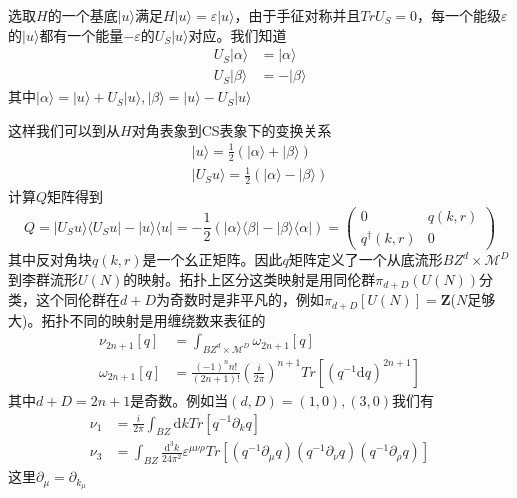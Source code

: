 \documentclass{article}
\numberwithin{equation}{subsection}
\begin{document}
选取$H$的一个基底$|u\rangle$满足$H|u\rangle=\varepsilon|u\rangle$，由于手征对称并且$TrU_S=0$，每一个能级$\varepsilon$的$|u\rangle$都有一个能量$-\varepsilon$的$U_S|u\rangle$对应。我们知道
\begin{equation}
    \begin{split}
        U_S|\alpha\rangle&=|\alpha\rangle\\
        U_S|\beta\rangle&=-|\beta\rangle
    \end{split}
\end{equation}
其中$|\alpha\rangle=|u\rangle+U_S|u\rangle,|\beta\rangle=|u\rangle-U_S|u\rangle$

这样我们可以到从$H$对角表象到CS表象下的变换关系
\begin{equation}
    \begin{split}
        |u\rangle=\frac{1}{2}(|\alpha\rangle+|\beta\rangle)\\
        |U_Su\rangle=\frac{1}{2}(|\alpha\rangle-|\beta\rangle)
    \end{split}
\end{equation}
计算$Q$矩阵得到
\begin{equation}
    Q=|U_Su\rangle\langle U_Su|-|u\rangle\langle u|=-\frac{1}{2}(|\alpha\rangle\langle\beta|-|\beta\rangle\langle\alpha|)=\begin{pmatrix}
        0&q(k,r)\\
        q^\dagger(k,r)&0
    \end{pmatrix}
\end{equation}
其中反对角块$q(k,r)$是一个幺正矩阵。因此$q$矩阵定义了一个从底流形$BZ^d\times \mathcal{M}^D$到李群流形$U(N)$的映射。拓扑上区分这类映射是用同伦群$\pi_{d+D}(U(N))$分类，这个同伦群在$d+D$为奇数时是非平凡的，例如$\pi_{d+D}[U(N)]=\mathbf{Z}$($N$足够大)。拓扑不同的映射是用缠绕数来表征的
\begin{equation}
    \begin{split}
        \nu_{2n+1}[q]&=\int_{BZ^d\times\mathcal{M}^D}\omega_{2n+1}[q]\\
        \omega_{2n+1}[q]&=\frac{(-1)^nn!}{(2n+1)!}\left(\frac{i}{2\pi}\right)^{n+1}Tr[(q^{-1}\mathrm{d}q)^{2n+1}]
    \end{split}
\end{equation}
其中$d+D=2n+1$是奇数。例如当$(d,D)=(1,0),(3,0)$我们有
\begin{equation}
    \begin{split}
        \nu_1&=\frac{i}{2\pi}\int_{BZ}\mathrm{d}kTr[q^{-1}\partial_k q]\\
        \nu_3&=\int_{BZ}\frac{\mathrm{d}^3k}{24\pi^2}\varepsilon^{\mu\nu\rho}Tr[(q^{-1}\partial_\mu q)(q^{-1}\partial_\nu q)(q^{-1}\partial_\rho q)]
    \end{split}
\end{equation}
这里$\partial_\mu=\partial_{k_\mu}$
\end{document}
